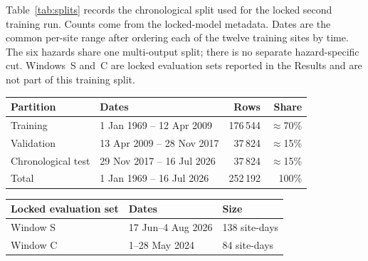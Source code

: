 Table~\ref{tab:splits} records the chronological split used for the locked second training run. Counts come from the locked-model metadata. Dates are the common per-site range after ordering each of the twelve training sites by time. The six hazards share one multi-output split; there is no separate hazard-specific cut. Windows~S and~C are locked evaluation sets reported in the Results and are not part of this training split.

\begin{center}
\begin{tabular}{@{}llrr@{}}
\toprule
Partition & Dates & Rows & Share \\
\midrule
Training & 1 Jan 1969 -- 12 Apr 2009 & 176\,544 & $\approx$70\% \\
Validation & 13 Apr 2009 -- 28 Nov 2017 & 37\,824 & $\approx$15\% \\
Chronological test & 29 Nov 2017 -- 16 Jul 2026 & 37\,824 & $\approx$15\% \\
\midrule
Total & 1 Jan 1969 -- 16 Jul 2026 & 252\,192 & 100\% \\
\bottomrule
\end{tabular}
\label{tab:splits}
\end{center}

\begin{center}
\begin{tabular}{@{}lll@{}}
\toprule
Locked evaluation set & Dates & Size \\
\midrule
Window S & 17 Jun--4 Aug 2026 & 138 site-days \\
Window C & 1--28 May 2024 & 84 site-days \\
\bottomrule
\end{tabular}
\label{tab:evalwindows}
\end{center}
